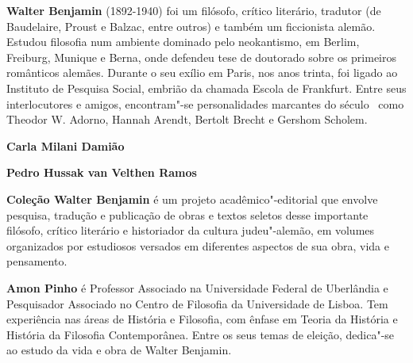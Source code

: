 
\textbf{Walter Benjamin} (1892-1940) foi um filósofo, crítico literário, tradutor (de Baudelaire, Proust e Balzac, entre outros) e também um ficcionista alemão. Estudou filosofia num ambiente dominado pelo neokantismo, em Berlim, Freiburg, Munique e Berna, onde defendeu tese de doutorado sobre os primeiros românticos alemães. Durante o seu exílio em Paris, nos anos trinta, foi ligado ao Instituto de Pesquisa Social, embrião da chamada Escola de Frankfurt. Entre seus interlocutores e amigos, encontram"-se personalidades marcantes do século~ como Theodor W. Adorno, Hannah Arendt, Bertolt Brecht e Gershom Scholem.

\textbf{\titulo} \lipsum[1]

\textbf{Carla Milani Damião} \lipsum[2] 

\textbf{Pedro Hussak van Velthen Ramos} \lipsum[3]

\textbf{Coleção Walter Benjamin} é um projeto acadêmico"-editorial que envolve pesquisa, tradução e publicação de obras e textos seletos desse importante filósofo, crítico literário e historiador da cultura judeu"-alemão, em volumes organizados por estudiosos versados em diferentes aspectos de sua obra, vida e pensamento. 

\textbf{Amon Pinho} é Professor Associado na Universidade Federal de Uberlândia e Pesquisador Associado no Centro de Filosofia da Universidade de Lisboa. Tem experiência nas áreas de História e Filosofia, com ênfase em Teoria da História e História da Filosofia Contemporânea. Entre os seus temas de eleição, dedica"-se ao estudo da vida e obra de Walter Benjamin.



